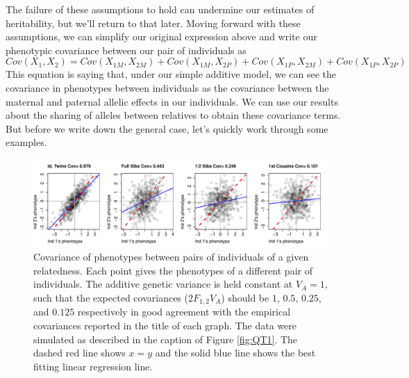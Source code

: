 The failure of these assumptions
to hold can undermine our estimates of heritability, but we'll
return to that later. Moving forward with these assumptions, we can
simplify our original expression above and write our phenotypic covariance between our pair of individuals as
\begin{equation}
Cov(X_1,X_2) =
Cov(X_{1M},X_{2M})+Cov(X_{1M},X_{2P})+Cov(X_{1P},X_{2M})
+Cov(X_{1P},X_{2P}) \label{cov_rels_1}
\end{equation}
This equation is saying that, under our simple additive model, we can see the
covariance in phenotypes between individuals as the covariance between
the maternal and paternal allelic effects in our individuals. We can use our results about
the sharing of alleles between relatives to obtain these covariance terms.
But before we write down the general case, let's quickly work through some
examples. \\

 \begin{figure}
 \begin{center}
 \includegraphics[width=\textwidth]{figures/Varying_rellys_phenos.pdf}
 \end{center}
 \caption{Covariance of phenotypes between pairs of individuals of a
   given relatedness. Each point gives the phenotypes of a different
   pair of individuals. The additive genetic variance is held constant
   at $V_A=1$, such that the expected covariances ($2F_{1,2}V_A$)
   should be $1$, $0.5$, $0.25$, and $0.125$ respectively in good agreement with
   the empirical covariances reported in the title of each graph. The
   data were simulated as described in
 the caption of Figure \ref{fig:QT1}. The dashed red line shows $x=y$ and the solid blue
line shows the best fitting linear regression line. }\label{fig:Varying_rellys_phenos}
 \end{figure}
 
